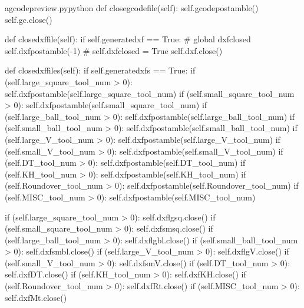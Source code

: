 \documentclass{ltxdoc}
\begin{document}
\lstset{firstnumber=\thegcpy}
\begin{writecode}{a}{gcodepreview.py}{python}
    def closegcodefile(self):
        self.gcodepostamble()
        self.gc.close()

    def closedxffile(self):
        if self.generatedxf == True:
#            global dxfclosed
            self.dxfpostamble(-1)
#            self.dxfclosed = True
            self.dxf.close()
    
    def closedxffiles(self):
        if self.generatedxfs == True:
            if (self.large_square_tool_num > 0):
                self.dxfpostamble(self.large_square_tool_num)
            if (self.small_square_tool_num > 0):
                self.dxfpostamble(self.small_square_tool_num)
            if (self.large_ball_tool_num > 0):
                self.dxfpostamble(self.large_ball_tool_num)
            if (self.small_ball_tool_num > 0):
                self.dxfpostamble(self.small_ball_tool_num)
            if (self.large_V_tool_num > 0):
                self.dxfpostamble(self.large_V_tool_num)
            if (self.small_V_tool_num > 0):
                self.dxfpostamble(self.small_V_tool_num)
            if (self.DT_tool_num > 0):
                self.dxfpostamble(self.DT_tool_num)
            if (self.KH_tool_num > 0):
                self.dxfpostamble(self.KH_tool_num)
            if (self.Roundover_tool_num > 0):
                self.dxfpostamble(self.Roundover_tool_num)
            if (self.MISC_tool_num > 0):
                self.dxfpostamble(self.MISC_tool_num)
                
            if (self.large_square_tool_num > 0):
                self.dxflgsq.close()
            if (self.small_square_tool_num > 0):
                self.dxfsmsq.close()
            if (self.large_ball_tool_num > 0):
                self.dxflgbl.close()
            if (self.small_ball_tool_num > 0):
                self.dxfsmbl.close()
            if (self.large_V_tool_num > 0):
                self.dxflgV.close()
            if (self.small_V_tool_num > 0):
                self.dxfsmV.close()
            if (self.DT_tool_num > 0):
                self.dxfDT.close()
            if (self.KH_tool_num > 0):
                self.dxfKH.close()
            if (self.Roundover_tool_num > 0):
                self.dxfRt.close()
            if (self.MISC_tool_num > 0):
                self.dxfMt.close()

\end{writecode}
\addtocounter{gcpy}{55}
%
\end{document}
